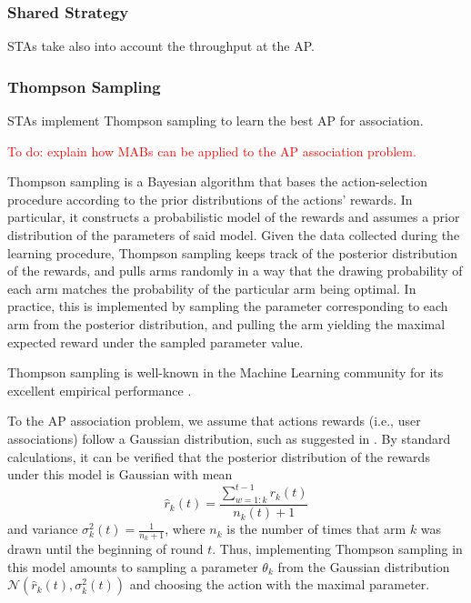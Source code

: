 \documentclass{ article}
\begin{document}
		\subsubsection{Shared Strategy}
		\label{section:shared}
			STAs take also into account the throughput at the AP.
	
		\subsubsection{Thompson Sampling}
		\label{section:thompson}
			STAs implement Thompson sampling to learn the best AP for association. 
			
			\textcolor{red}{To do: explain how MABs can be applied to the AP association problem.}	
			
			Thompson sampling \cite{thompson1933likelihood} is a Bayesian algorithm that bases the action-selection procedure according to the prior distributions of the actions' rewards. In particular, it constructs a probabilistic model of the rewards and assumes a prior distribution of the parameters of said model. Given the data collected during the learning procedure, Thompson sampling keeps track of the posterior distribution of the rewards, and pulls arms randomly in a way that the drawing probability of each arm matches the probability of the particular arm being optimal. In practice, this is implemented by sampling the parameter corresponding to each arm from the posterior distribution, and pulling the arm yielding the maximal expected reward under the sampled parameter value.
					
			Thompson sampling is well-known in the Machine Learning community for its excellent empirical performance \cite{CL11}. 
			 
			To the AP association problem, we assume that actions rewards (i.e., user associations) follow a Gaussian distribution, such as suggested in \cite{agrawal2013further}. By standard calculations, it can be verified that the posterior distribution of the rewards under this model is Gaussian with mean 
			\begin{equation}
				\hat{r}_k(t) = \frac{\sum_{w=1:k}^{t-1} r_k(t) }{n_k(t) + 1}
				\nonumber
			\end{equation}
			and variance $\sigma_k^2(t) = \frac{1}{n_k + 1}$, where $n_k$ is the number of times that arm $k$ was drawn until the beginning of round $t$. Thus, implementing Thompson sampling in this model amounts to sampling a parameter $\theta_k$ from the Gaussian distribution $\mathcal{N}\left(\hat{r}_k(t),\sigma_k^2(t)\right)$ and choosing the action with the maximal parameter.   
			
\end{document}
